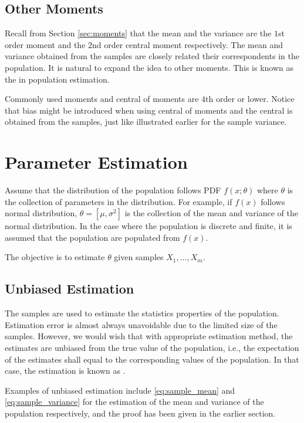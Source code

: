 \subsection{Other Moments}

Recall from Section \ref{sec:moments} that the mean and the variance are the $1$st order moment and the $2$nd order central moment respectively. The mean and variance obtained from the samples are closely related their correspondents in the population. It is natural to expand the idea to other moments. This is known as the  in population estimation.

Commonly used moments and central of moments are $4$th order or lower. Notice that bias might be introduced when using central of moments and the central is obtained from the samples, just like illustrated earlier for the sample variance.

\section{Parameter Estimation} \label{sec:mlemap}

Assume that the distribution of the population follows PDF $f(x;\theta)$ where $\theta$ is the collection of parameters in the distribution. For example, if $f(x)$ follows normal distribution, $\theta=[\mu, \sigma^2]$ is the collection of the mean and variance of the normal distribution.  In the case where the population is discrete and finite, it is assumed that the population are populated from $f(x)$.

The objective is to estimate $\theta$ given samples $X_1, \ldots, X_m$.

\subsection{Unbiased Estimation}

The samples are used to estimate the statistics properties of the population. Estimation error is almost always unavoidable due to the limited size of the samples. However, we would wish that with appropriate estimation method, the estimates are unbiased from the true value of the population, i.e., the expectation of the estimates shall equal to the corresponding values of the population. In that case, the estimation is known as . 

Examples of unbiased estimation include \eqref{eq:sample_mean} and \eqref{eq:sample_variance} for the estimation of the mean and variance of the population respectively, and the proof has been given in the earlier section.

